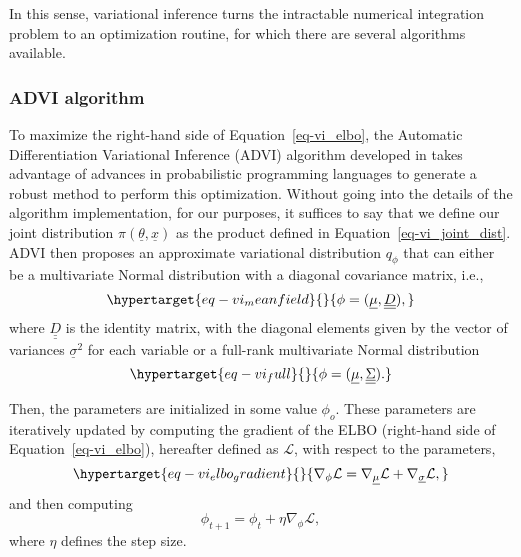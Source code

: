 \documentclass[
  letterpaper,
  DIV=11,
  numbers=noendperiod]{scrartcl}
\begin{document}
\begin{refsegment}
In this sense, variational inference turns the intractable numerical
integration problem to an optimization routine, for which there are
several algorithms available.

\hypertarget{advi-algorithm}{%
\subsubsection{ADVI algorithm}\label{advi-algorithm}}

To maximize the right-hand side of Equation~\ref{eq-vi_elbo}, the
Automatic Differentiation Variational Inference (ADVI) algorithm
developed in \autocite{kucukelbir2016} takes advantage of advances in
probabilistic programming languages to generate a robust method to
perform this optimization. Without going into the details of the
algorithm implementation, for our purposes, it suffices to say that we
define our joint distribution \(\pi(\underline{\theta}, \underline{x})\)
as the product defined in Equation~\ref{eq-vi_joint_dist}. ADVI then
proposes an approximate variational distribution \(q_\phi\) that can
either be a multivariate Normal distribution with a diagonal covariance
matrix, i.e., \begin{equation}\protect\hypertarget{eq-vi_meanfield}{}{
\phi = (\underline{\mu}, \underline{\underline{D}}),
}\label{eq-vi_meanfield}\end{equation} where
\(\underline{\underline{D}}\) is the identity matrix, with the diagonal
elements given by the vector of variances \(\underline{\sigma}^2\) for
each variable or a full-rank multivariate Normal distribution
\begin{equation}\protect\hypertarget{eq-vi_full}{}{
\phi = (\underline{\mu}, \underline{\underline{\Sigma}}).
}\label{eq-vi_full}\end{equation}

Then, the parameters are initialized in some value \(\phi_o\). These
parameters are iteratively updated by computing the gradient of the ELBO
(right-hand side of Equation~\ref{eq-vi_elbo}), hereafter defined as
\(\mathcal{L}\), with respect to the parameters,
\begin{equation}\protect\hypertarget{eq-vi_elbo_gradient}{}{
\nabla_\phi \mathcal{L} = \nabla_{\underline{\mu}} \mathcal{L} + 
\nabla_{\underline{\sigma}}\mathcal{L},
}\label{eq-vi_elbo_gradient}\end{equation} and then computing \[
\phi_{t+1} = \phi_{t} + \eta \nabla_\phi \mathcal{L},
\] where \(\eta\) defines the step size.


\end{refsegment}
\end{document}
